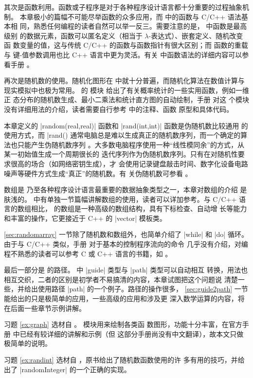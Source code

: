 其次是函数利用。函数或子程序是对于各种程序设计语言都十分重要的过程抽象机制。
本章极小的篇幅不可能尽举函数的众多应用，而 \Asy{} 中的函数与 C/C++ 语法基本相
同，熟悉任何编程的读者自然可以举一反三。需要注意的是，\Asy{} 中函数是最高级别
的数据元素，函数可以匿名定义（相当于 $\lambda$-表达式）、嵌套定义、随机改变函
数变量的值，这与传统 C/C++ 的函数与函数指针有很大区别；而 \Asy{} 函数的重载与
键-值参数调用也比 C++ 语言中更为灵活。有关 \Asy{} 中函数语法的详细内容可以参
看手册 \cite{asyman}。

再次是随机数的使用。随机化图形在 \MP{} 中就十分普遍，而随机化算法在数值计算与
现实模拟中也极为常用。\Asy{} 的  模块
 给出了有关概率统计的一些实用函数，例如一维正
态分布的随机数生成、最小二乘法和统计直方图的自动绘制，手册 \cite{asyman} 对这
个模块没有详细用法的介绍，读者需要自行参考  中的注释、函数
原型和具体代码。

本章定义的 |random(real,real)| 函数和 |rand(int,int)| 函数是伪随机数比较通用
的使用方式，而 |rand() %
通常电脑总是难以生成真正的随机数序列，而一个确定的算法也只能产生伪随机数序列
。大多数电脑程序使用一种“线性模同余”的方式，从某一初始值生成一个周期很长的
迭代序列作为伪随机数序列。只有在对随机性要求很高的场合（如网络密钥生成），才
会使用记录键盘敲击时间、数字化设备电路噪声等硬件方式生成“真正”的随机数。有
关伪随机数可参看 \cite{taocp2}。

数组是 \Asy{} 乃至各种程序设计语言最重要的数据抽象类型之一，本章对数组的介绍
是肤浅的。\cite{asyman} 中有单独一节篇幅讲解数组的使用，读者可以详加参考。与
C/C++ 语言的数组相比，\Asy{} 的数组是一种高级的数组结构，具有下标检查、自动增
长等能力和丰富的操作，它更接近于 C++ 的 \cinline|vector| 模板类。

\autoref{sec:randomarray} 一节除了随机数和数组外，也简单介绍了 |while| 和
|do| 循环。由于与 C/C++ 类似，手册 \cite{asyman} 对于基本的控制程序流向的命令
几乎没有介绍，对编程不熟悉的读者可以参考 C 或 C++ 语言的书籍，如 \cite{kandr}
。

最后一部分是 \Asy{} 的路径。\Asy{} 中 |guide| 类型与 |path| 类型可以自动相互
转换，用法也相互交织，二者的区别是初学者不易搞清的内容，本章试图把这个问题说
清楚一些，并给出使用路径 |path| 的一个例子。路径的操作很多，
\autoref{sec:guide2path} 一节能给出的只是极简单的应用，一些高级的应用和涉及更
深入数学运算的内容，将在后面一些章节示例讲解。

习题 \ref{ex:graph} 选材自 \cite{pgfman}。 模块用来绘制各类函
数图形，功能十分丰富，在官方手册 \cite{asyman} 中已经有较详细的讲解和示例（但
这部分手册尚没有中文翻译），故本文只做极简单的说明。

习题 \ref{ex:randint} 选材自 \cite{roberts1995}，原书给出了随机数函数使用的许
多有用的技巧，并给出了 \cinline|randomInteger| 的一个正确的实现。

\endinput


